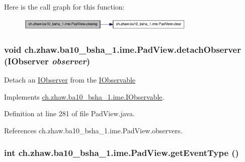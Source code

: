 Here is the call graph for this function:\nopagebreak
\begin{figure}[H]
\begin{center}
\leavevmode
\includegraphics[width=241pt]{classch_1_1zhaw_1_1ba10__bsha__1_1_1ime_1_1PadView_a4e5d62bdc50d1efae84f0cde40beeb51_cgraph}
\end{center}
\end{figure}
\hypertarget{classch_1_1zhaw_1_1ba10__bsha__1_1_1ime_1_1PadView_a1a924fadb8d0d1e9278a1ad136bcfb13}{
\subsubsection[{detachObserver}]{\setlength{\rightskip}{0pt plus 5cm}void ch.zhaw.ba10\_\-bsha\_\-1.ime.PadView.detachObserver ({\bf IObserver} {\em observer})}}
\label{classch_1_1zhaw_1_1ba10__bsha__1_1_1ime_1_1PadView_a1a924fadb8d0d1e9278a1ad136bcfb13}
Detach an \hyperlink{interfacech_1_1zhaw_1_1ba10__bsha__1_1_1ime_1_1IObserver}{IObserver} from the \hyperlink{interfacech_1_1zhaw_1_1ba10__bsha__1_1_1ime_1_1IObservable}{IObservable} 

Implements \hyperlink{interfacech_1_1zhaw_1_1ba10__bsha__1_1_1ime_1_1IObservable_a18a068196edc176c68282162bab22eff}{ch.zhaw.ba10\_\-bsha\_\-1.ime.IObservable}.

Definition at line 281 of file PadView.java.

References ch.zhaw.ba10\_\-bsha\_\-1.ime.PadView.observers.\hypertarget{classch_1_1zhaw_1_1ba10__bsha__1_1_1ime_1_1PadView_acea9e02a6fe22cd86a909dcd20de83f0}{
\subsubsection[{getEventType}]{\setlength{\rightskip}{0pt plus 5cm}int ch.zhaw.ba10\_\-bsha\_\-1.ime.PadView.getEventType ()}}
\label{classch_1_1zhaw_1_1ba10__bsha__1_1_1ime_1_1PadView_acea9e02a6fe22cd86a909dcd20de83f0}


